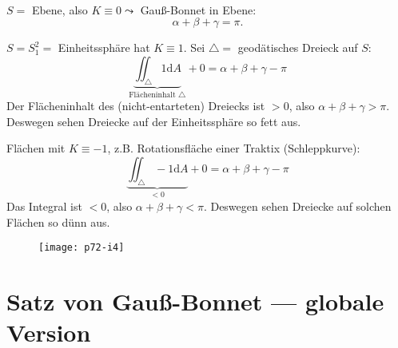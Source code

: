 \begin{remark}
  \
  \begin{enumerate}

    \item \( S = \) Ebene, also \( K \equiv 0 \leadsto \) Gauß-Bonnet in Ebene:
    \begin{equation*}
      \alpha + \beta + \gamma = \pi\text{.}
    \end{equation*}

    \begin{minipage}{.675\textwidth}
      \item \( S = S_1^2 =  \) Einheitssphäre hat \( K \equiv 1 \). Sei \( \triangle = \) geodätisches Dreieck auf \( S \):
      \begin{equation*}
        \underbrace{\iint_\triangle 1\text{d}A}_{\text{Flächeninhalt } \triangle} + 0 = \alpha + \beta + \gamma - \pi
      \end{equation*}
      Der Flächeninhalt des (nicht-entarteten) Dreiecks ist \( > 0 \), also \( \alpha + \beta + \gamma > \pi \). Deswegen sehen Dreiecke auf der Einheitssphäre so fett aus.

      \item Flächen mit \( K \equiv -1 \), z.B. Rotationsfläche einer Traktix (Schleppkurve):
      \begin{equation*}
        \underbrace{\iint_\triangle -1\text{d}A}_{< 0} + 0 = \alpha + \beta + \gamma - \pi
      \end{equation*}
      Das Integral ist \( < 0 \), also \( \alpha + \beta + \gamma < \pi \). Deswegen sehen Dreiecke auf solchen Flächen so dünn aus.
    \end{minipage}
    \hfill
    \begin{minipage}{.3\textwidth}
      \begin{figure}[H]
        \texttt{[image: p72-i4]}
      \end{figure}
    \end{minipage}

  \end{enumerate}
\end{remark}

\section{Satz von Gauß-Bonnet --- globale Version}

